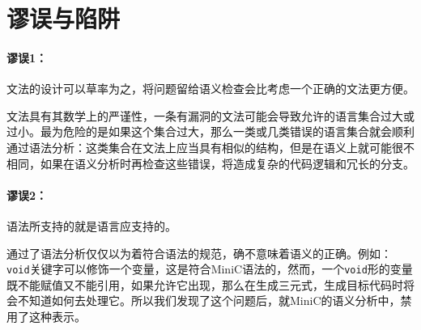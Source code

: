 \section{谬误与陷阱}
\label{pitfallc1}
\paragraph*{谬误1：}文法的设计可以草率为之，将问题留给语义检查会比考虑一个正确的文法更方便。

文法具有其数学上的严谨性，一条有漏洞的文法可能会导致允许的语言集合过大或过小。最为危险的是如果这个集合过大，那么一类或几类错误的语言集合就会顺利通过语法分析：这类集合在文法上应当具有相似的结构，但是在语义上就可能很不相同，如果在语义分析时再检查这些错误，将造成复杂的代码逻辑和冗长的分支。

\paragraph*{谬误2：}语法所支持的就是语言应支持的。

通过了语法分析仅仅以为着符合语法的规范，确不意味着语义的正确。例如：\verb|void|关键字可以修饰一个变量，这是符合MiniC语法的，然而，一个\verb|void|形的变量既不能赋值又不能引用，如果允许它出现，那么在生成三元式，生成目标代码时将会不知道如何去处理它。所以我们发现了这个问题后，就MiniC的语义分析中，禁用了这种表示。

